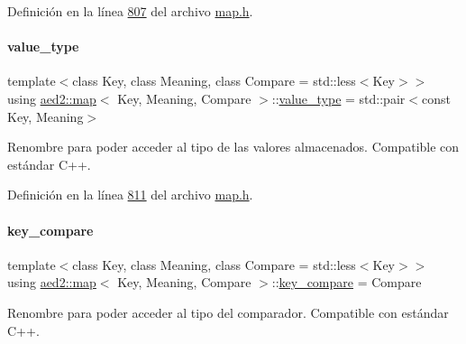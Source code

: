 Definición en la línea \hyperlink{map_8h_source_l00807}{807} del archivo \hyperlink{map_8h_source}{map.\+h}.

\mbox{\label{classaed2_1_1map_a719db98e0ff9a837610f76be33264680_a719db98e0ff9a837610f76be33264680}} 
\paragraph{\texorpdfstring{value\+\_\+type}{value\_type}}
{\footnotesize\ttfamily template$<$class Key, class Meaning, class Compare = std\+::less$<$\+Key$>$$>$ \\
using \hyperlink{classaed2_1_1map}{aed2\+::map}$<$ Key, Meaning, Compare $>$\+::\hyperlink{classaed2_1_1map_a719db98e0ff9a837610f76be33264680_a719db98e0ff9a837610f76be33264680}{value\+\_\+type} =  std\+::pair$<$const Key, Meaning$>$}



Renombre para poder acceder al tipo de las valores almacenados. Compatible con estándar C++. 



Definición en la línea \hyperlink{map_8h_source_l00811}{811} del archivo \hyperlink{map_8h_source}{map.\+h}.

\mbox{\label{classaed2_1_1map_a3efa081d3379ab76f33a5ef9fe697523_a3efa081d3379ab76f33a5ef9fe697523}} 
\paragraph{\texorpdfstring{key\+\_\+compare}{key\_compare}}
{\footnotesize\ttfamily template$<$class Key, class Meaning, class Compare = std\+::less$<$\+Key$>$$>$ \\
using \hyperlink{classaed2_1_1map}{aed2\+::map}$<$ Key, Meaning, Compare $>$\+::\hyperlink{classaed2_1_1map_a3efa081d3379ab76f33a5ef9fe697523_a3efa081d3379ab76f33a5ef9fe697523}{key\+\_\+compare} =  Compare}



Renombre para poder acceder al tipo del comparador. Compatible con estándar C++. 



